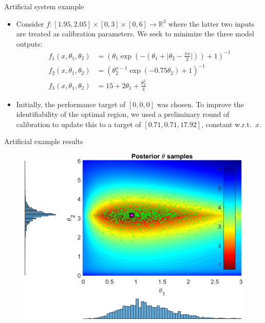 \documentclass[final]{beamer}
\newlength{\onecolwid}
\newlength{\twocolwid}
\begin{document}
\begin{frame}[t]
\begin{columns}[t]
\begin{column}{\twocolwid}
\begin{columns}[t,totalwidth=\twocolwid]
\begin{column}{\onecolwid}
\begin{alertblock}{Artificial system example}
\vspace{-10mm}
\begin{itemize}

\item Consider $f:[1.95,2.05]\times[0,3]\times[0,6]\to \mathbb R^3$ where the latter two inputs are treated as calibration parameters. We seek to minimize the three model outputs:
\begin{align*}
f_1(x,\theta_1,\theta_2) &= \left( \theta_1 \exp \left ( - \left( \theta_1 + \lvert \theta_2 - \frac{\pi x}2\rvert \right) \right) + 1 \right)^{-1}\\
f_2(x,\theta_1,\theta_2) &= \left(\theta_2^{x-1} \exp\left(-0.75\theta_2\right)+1\right)^{-1}\\
f_3(x,\theta_1,\theta_2)&=15+2\theta_1+\frac{\theta_2^2}4
\end{align*}

\item Initially, the performance target of $[0,0,0]$ was chosen. To improve the identifiability of the optimal region, we used a preliminary round of calibration to update this to a target of $[0.71,0.71,17.92]$, constant w.r.t.\ $x$.

\end{itemize}
\end{alertblock}


\begin{alertblock}{Artificial example results}


\begin{figure}[h!]
\includegraphics[width=0.95\linewidth]{FIG_post_theta_heatmap_desobs0_lambdadelta1}
\label{gp_ex}
\end{figure}


\end{alertblock}
\end{column}
\end{columns}
\end{column}
\end{columns}
\end{frame}
\end{document}

